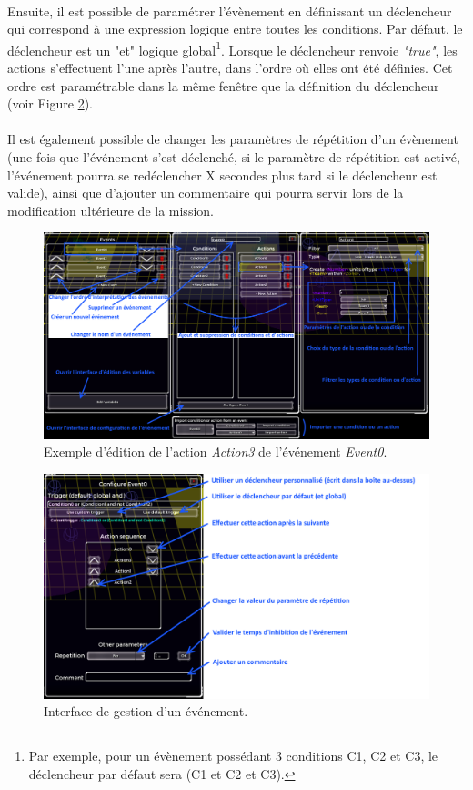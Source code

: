 \documentclass[a4paper]{article}
\begin{document}
\paragraph{ }
Ensuite, il est possible de paramétrer l'évènement en définissant un déclencheur qui correspond à une expression logique entre toutes les conditions. Par défaut, le déclencheur est un "et" logique global\footnote{Par exemple, pour un évènement possédant 3 conditions C1, C2 et C3, le déclencheur par défaut sera (C1 et C2 et C3).}. Lorsque le déclencheur renvoie \textit{"true"}, les actions s'effectuent l'une après l'autre, dans l'ordre où elles ont été définies. Cet ordre est paramétrable dans la même fenêtre que la définition du déclencheur (voir Figure \ref{fig:editor-eventconfig}).
\paragraph{ }
Il est également possible de changer les paramètres de répétition d'un évènement (une fois que l'événement s'est déclenché, si le paramètre de répétition est activé, l'événement pourra se redéclencher X secondes plus tard si le déclencheur est valide), ainsi que d'ajouter un commentaire qui pourra servir lors de la modification ultérieure de la mission.
\begin{figure}[H]
\centering
\includegraphics[width=\linewidth]{editor-trigger.png}
\caption{Exemple d'édition de l'action \textit{Action3} de l'événement \textit{Event0}.}
\label{fig:editor-trigger}
\end{figure}
\begin{figure}[H]
\centering
\includegraphics[width=\linewidth]{editor-eventconfig.png}
\caption{Interface de gestion d'un événement.}
\label{fig:editor-eventconfig}
\end{figure}
\end{document}
